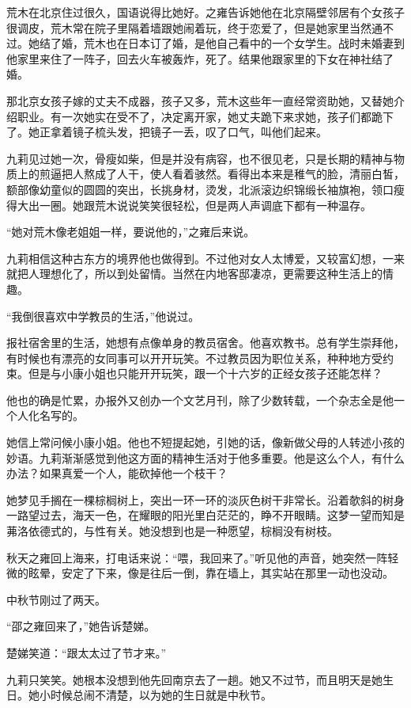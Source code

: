 \par 荒木在北京住过很久，国语说得比她好。之雍告诉她他在北京隔壁邻居有个女孩子很调皮，荒木常在院子里隔着墙跟她闹着玩，终于恋爱了，但是她家里当然通不过。她结了婚，荒木也在日本订了婚，是他自己看中的一个女学生。战时未婚妻到他家里来住了一阵子，回去火车被轰炸，死了。结果他跟家里的下女在神社结了婚。
\par 那北京女孩子嫁的丈夫不成器，孩子又多，荒木这些年一直经常资助她，又替她介绍职业。有一次她实在受不了，决定离开家，她丈夫跪下来求她，孩子们都跪下了。她正拿着镜子梳头发，把镜子一丢，叹了口气，叫他们起来。
\par 九莉见过她一次，骨瘦如柴，但是并没有病容，也不很见老，只是长期的精神与物质上的煎逼把人熬成了人干，使人看着骇然。看得出本来是稚气的脸，清丽白皙，额部像幼童似的圆圆的突出，长挑身材，烫发，北派滚边织锦缎长袖旗袍，领口瘦得大出一圈。她跟荒木说说笑笑很轻松，但是两人声调底下都有一种温存。
\par “她对荒木像老姐姐一样，要说他的，”之雍后来说。
\par 九莉相信这种古东方的境界他也做得到。不过他对女人太博爱，又较富幻想，一来就把人理想化了，所以到处留情。当然在内地客邸凄凉，更需要这种生活上的情趣。
\par “我倒很喜欢中学教员的生活，”他说过。
\par 报社宿舍里的生活，她想有点像单身的教员宿舍。他喜欢教书。总有学生崇拜他，有时候也有漂亮的女同事可以开开玩笑。不过教员因为职位关系，种种地方受约束。但是与小康小姐也只能开开玩笑，跟一个十六岁的正经女孩子还能怎样？
\par 他也的确是忙累，办报外又创办一个文艺月刊，除了少数转载，一个杂志全是他一个人化名写的。
\par 她信上常问候小康小姐。他也不短提起她，引她的话，像新做父母的人转述小孩的妙语。九莉渐渐感觉到他这方面的精神生活对于他多重要。他是这么个人，有什么办法？如果真爱一个人，能砍掉他一个枝干？
\par 她梦见手搁在一棵棕榈树上，突出一环一环的淡灰色树干非常长。沿着欹斜的树身一路望过去，海天一色，在耀眼的阳光里白茫茫的，睁不开眼睛。这梦一望而知是茀洛依德式的，与性有关。她没想到也是一种愿望，棕榈没有树枝。
\par 秋天之雍回上海来，打电话来说：“喂，我回来了。”听见他的声音，她突然一阵轻微的眩晕，安定了下来，像是往后一倒，靠在墙上，其实站在那里一动也没动。
\par 中秋节刚过了两天。
\par “邵之雍回来了，”她告诉楚娣。
\par 楚娣笑道：“跟太太过了节才来。”
\par 九莉只笑笑。她根本没想到他先回南京去了一趟。她又不过节，而且明天是她生日。她小时候总闹不清楚，以为她的生日就是中秋节。
